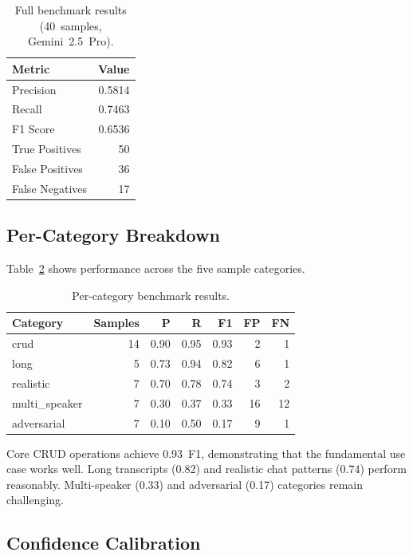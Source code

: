 \documentclass[12pt]{article}
\begin{document}
\begin{table}[ht]
\centering
\caption{Full benchmark results (40~samples, Gemini~2.5~Pro).}
\label{tab:benchmark}
\begin{tabular}{@{}lr@{}}
\toprule
\textbf{Metric} & \textbf{Value} \\
\midrule
Precision & 0.5814 \\
Recall    & 0.7463 \\
F1 Score  & 0.6536 \\
True Positives  & 50 \\
False Positives & 36 \\
False Negatives & 17 \\
\bottomrule
\end{tabular}
\end{table}

\subsection{Per-Category Breakdown}

Table~\ref{tab:categories} shows performance across the five sample
categories.

\begin{table}[ht]
\centering
\caption{Per-category benchmark results.}
\label{tab:categories}
\begin{tabular}{@{}lrrrrrr@{}}
\toprule
\textbf{Category} & \textbf{Samples} & \textbf{P} & \textbf{R}
& \textbf{F1} & \textbf{FP} & \textbf{FN} \\
\midrule
crud          & 14 & 0.90 & 0.95 & 0.93 &  2 &  1 \\
long          &  5 & 0.73 & 0.94 & 0.82 &  6 &  1 \\
realistic     &  7 & 0.70 & 0.78 & 0.74 &  3 &  2 \\
multi\_speaker &  7 & 0.30 & 0.37 & 0.33 & 16 & 12 \\
adversarial   &  7 & 0.10 & 0.50 & 0.17 &  9 &  1 \\
\bottomrule
\end{tabular}
\end{table}

Core CRUD operations achieve 0.93~F1, demonstrating that the fundamental
use case works well. Long transcripts (0.82) and realistic chat patterns
(0.74) perform reasonably. Multi-speaker (0.33) and adversarial (0.17)
categories remain challenging.

\subsection{Confidence Calibration}
\end{document}

